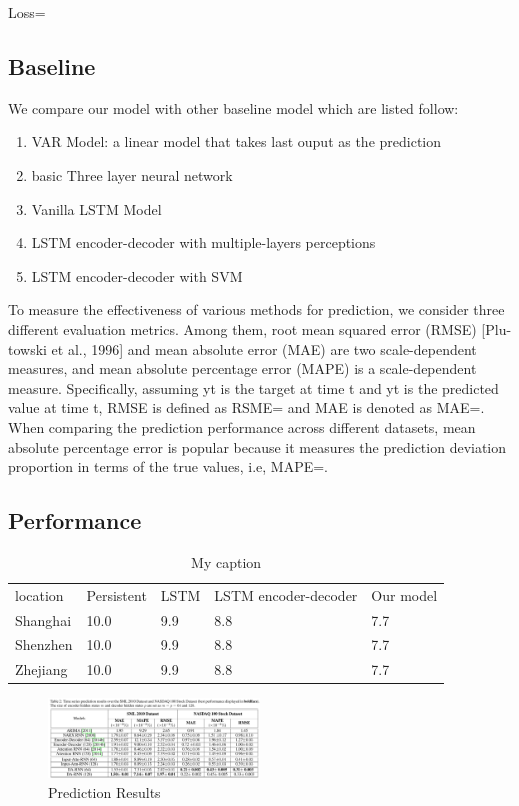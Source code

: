 \documentclass[5p]{elsarticle}
\begin{document}
Loss={}





\subsection{Baseline}
We compare our model with other baseline model which are listed follow:
\begin{enumerate}
  \item VAR Model: a linear model that takes last ouput as the prediction
  \item basic Three layer neural network
  \item Vanilla LSTM Model
  \item LSTM encoder-decoder with multiple-layers perceptions
  \item LSTM encoder-decoder with SVM
\end{enumerate}

To measure the effectiveness of various methods for prediction, we consider three different evaluation metrics. Among them, root mean squared error (RMSE) [Plu- towski et al., 1996] and mean absolute error (MAE) are two scale-dependent measures, and mean absolute percentage error (MAPE) is a scale-dependent measure. Specifically, assuming yt is the target at time t and yt is the predicted value at time t, RMSE is defined as RSME={} and MAE is denoted as MAE={}. When comparing the prediction performance across different datasets, mean absolute percentage error is popular because it measures the prediction deviation proportion in terms of the true values, i.e, MAPE={}.


\subsection{Performance}
\begin{table}[]
\centering
\caption{My caption}
\label{my-label}
\begin{tabular}{lllll}
location & Persistent & LSTM & LSTM encoder-decoder & Our model \\
Shanghai & 10.0       & 9.9  & 8.8                  & 7.7       \\
Shenzhen & 10.0       & 9.9  & 8.8                  & 7.7       \\
Zhejiang & 10.0       & 9.9  & 8.8                  & 7.7      
\end{tabular}
\end{table}

\begin{figure}[h]
    \centering
    \includegraphics[width=0.5\textwidth]{prediction_results.png}
    \caption{Prediction Results}
    \label{fig:Prediction Results}
\end{figure}
\end{document}
